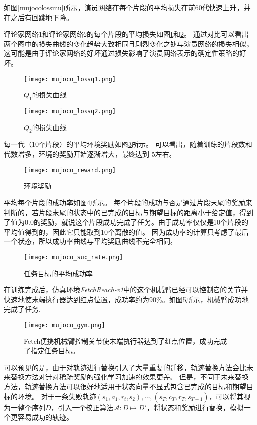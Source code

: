         如图\ref{mujocolossmu}所示，演员网络在每个片段的平均损失在前60代快速上升，并在之后有回跳地下降。

        评论家网络1和评论家网络2的每个片段的平均损失如图\ref{mujocolossq1}和\ref{mujocolossq2}。
        通过对比可以看出两个图中的损失曲线的变化趋势大致相同且剧烈变化之处与演员网络的损失相似，这可能是由于评论家网络的好坏通过损失影响了演员网络表示的确定性策略的好坏。

        \begin{figure}[htpb]
        \centering
        \texttt{[image: mujoco\_lossq1.png]}
        \caption{$Q_1$的损失曲线}
        \label{mujocolossq1} 
        \end{figure}

        \begin{figure}[htpb]
        \centering
        \texttt{[image: mujoco\_lossq2.png]}
        \caption{$Q_2$的损失曲线}
        \label{mujocolossq2} 
        \end{figure}

        每一代（10个片段）的平均环境奖励如图\ref{mujocoreward}所示。
        可以看出，随着训练的片段数和代数增多，环境的奖励开始逐渐增大，最终达到-5左右。
        \begin{figure}[htpb]
        \centering
        \texttt{[image: mujoco\_reward.png]}
        \caption{环境奖励}
            \label{mujocoreward}
        \end{figure}

        平均每个片段的成功率如图\ref{mujocosuc}所示。
        每个片段的成功与否是通过片段末尾的奖励来判断的，若片段末尾的状态中的已完成的目标与期望目标的距离小于给定值，得到了值为0.0的奖励，就说这个片段成功完成了任务。由于成功率仅仅是10个片段的平均值得到的，因此它只能取到10个离散的值。
        因为成功率的计算只考虑了最后一个状态，所以成功率曲线与平均奖励曲线不完全相同。
        \begin{figure}[htpb]
        \centering
        \texttt{[image: mujoco\_suc\_rate.png]}
        \caption{任务目标的平均成功率}
            \label{mujocosuc}
        \end{figure}

        在训练完成后，仿真环境\emph{FetchReach-v1}中的这个机械臂已经可以控制它的关节并快速地使末端执行器达到红点位置，成功率约为90\%。如图\ref{mujoco_gym}所示，机械臂成功地完成了任务.
        \begin{figure}[htpb]
        \centering
        \texttt{[image: mujoco\_gym.png]}
            \caption{Fetch便携机械臂控制关节使末端执行器达到了红点位置，成功完成了指定任务目标。}
            \label{mujoco_gym}
        \end{figure}
        可以预见的是，由于对轨迹进行替换引入了大量重复的迁移，轨迹替换方法会比未来替换方法对针对稀疏奖励的强化学习加速的效果更差。
        但是，不同于未来替换方法，轨迹替换方法可以很好地适用于状态向量不显式包含已完成的目标和期望目标的环境。
        对于一条失败轨迹$(s_1,a_1,r_t,s_2),\cdots,(s_T,a_T,r_T,s_{T+1})$，可以将其视为一整个序列$D$，引入一个校正算法$\mathcal A:D\mapsto D'$，将状态和奖励进行替换，模拟一个更容易成功的轨迹。

